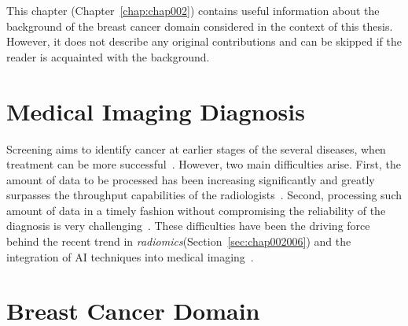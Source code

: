 \clearpage
\label{chap:chap002}

This chapter (Chapter~\ref{chap:chap002}) contains useful information about the background of the breast cancer domain considered in the context of this thesis.
However, it does not describe any original contributions and can be skipped if the reader is acquainted with the background.

\section{Medical Imaging Diagnosis}
\label{sec:chap002001}

Screening aims to identify cancer at earlier stages of the several diseases, when treatment can be more successful~\cite{McKinney2020}.
However, two main difficulties arise.
First, the amount of data to be processed has been increasing significantly and greatly surpasses the throughput capabilities of the radiologists~\cite{HANNA20181709}.
Second, processing such amount of data in a timely fashion without compromising the reliability of the diagnosis is very challenging~\cite{waite2017systemic, stec2018systematic}.
These difficulties have been the driving force behind the recent trend in {\it radiomics}\footnotemark[4] (Section~\ref{sec:chap002006}) and the integration of \ac{AI} techniques into medical imaging~\cite{Lambin2017, pesapane2018artificial, doi:10.1148/radiol.2015151169}.


\section{Breast Cancer Domain}
\label{sec:chap002002}

